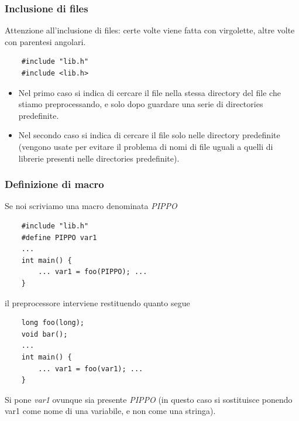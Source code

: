 \subsubsection{Inclusione di files} Attenzione all'inclusione di files: certe volte viene fatta con virgolette, altre volte con parentesi angolari.
\begin{verbatim}
	#include "lib.h"
	#include <lib.h>
\end{verbatim}
\begin{itemize}
	\item Nel primo caso si indica di cercare il file nella stessa directory del file che stiamo preprocessando, e solo dopo guardare una serie di directories predefinite.
	\item Nel secondo caso si indica di cercare il file solo nelle directory predefinite (vengono usate per evitare il problema di nomi di file uguali a quelli di librerie presenti nelle directories predefinite).
\end{itemize}
\subsubsection{Definizione di macro}
Se noi scriviamo una macro denominata \emph{PIPPO}
\begin{verbatim}
	#include "lib.h"
	#define PIPPO var1
	...
	int main() {
		... var1 = foo(PIPPO); ...
	}
\end{verbatim}
il preprocessore interviene restituendo quanto segue
\begin{verbatim}
	long foo(long);
	void bar();
	...
	int main() {
		... var1 = foo(var1); ...
	}
\end{verbatim}
Si pone \emph{var1} ovunque sia presente \emph{PIPPO} (in questo caso si sostituisce ponendo var1 come nome di una variabile, e non come una stringa).

